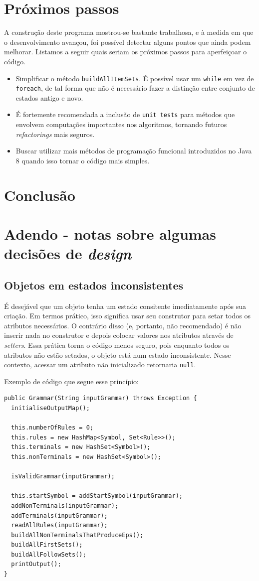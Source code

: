 \documentclass[11pt]{article}
\begin{document}
\section{Próximos passos}
\label{sec:orgheadline15}
A construção deste programa mostrou-se bastante trabalhosa, e à medida em que o
desenvolvimento avançou, foi possível detectar alguns pontos que ainda podem
melhorar. Listamos a seguir quais seriam os próximos passos para aperfeiçoar o código. 
\begin{itemize}
\item Simplificar o método \texttt{buildAllItemSets}. É possível usar um \texttt{while} em vez de
\texttt{foreach}, de tal forma que não é necessário fazer a distinção entre conjunto
de estados antigo e novo.
\item É fortemente recomendada a inclusão de \texttt{unit tests} para métodos que envolvem
computações importantes nos algoritmos, tornando futuros \emph{refactorings} mais seguros.
\item Buscar utilizar mais métodos de programação funcional introduzidos no Java 8
quando isso tornar o código mais simples.
\end{itemize}
\section{Conclusão}
\label{sec:orgheadline16}
\section{Adendo - notas sobre algumas decisões de \emph{design}}
\label{sec:orgheadline3}
\subsection{Objetos em estados inconsistentes}
\label{sec:orgheadline17}
É desejável que um objeto tenha um estado consitente imediatamente após sua
criação. Em termos prático, isso significa usar seu construtor para setar todos
os atributos necessários. O contrário disso (e, portanto, não recomendado) é não
inserir nada no construtor e depois colocar valores nos atributos através de \emph{setters}. 
Essa prática torna o código menos seguro, pois enquanto todos os atributos não
estão setados, o objeto está num estado inconsistente. Nesse contexto, acessar um
atributo não inicializado retornaria \texttt{null}.

Exemplo de código que segue esse princípio:

\begin{verbatim}
public Grammar(String inputGrammar) throws Exception {
  initialiseOutputMap();

  this.numberOfRules = 0;
  this.rules = new HashMap<Symbol, Set<Rule>>();
  this.terminals = new HashSet<Symbol>();
  this.nonTerminals = new HashSet<Symbol>();

  isValidGrammar(inputGrammar);

  this.startSymbol = addStartSymbol(inputGrammar);
  addNonTerminals(inputGrammar);
  addTerminals(inputGrammar);
  readAllRules(inputGrammar);
  buildAllNonTerminalsThatProduceEps();
  buildAllFirstSets();
  buildAllFollowSets();
  printOutput();
}
\end{verbatim}
\end{document}
